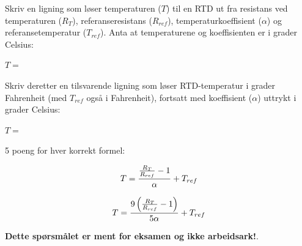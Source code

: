 

Skriv en ligning som løser temperaturen ($T$) til en RTD ut fra resistans ved temperaturen ($R_T$), referanseresistans ($R_{ref}$), temperaturkoeffisient ($\alpha$) og referansetemperatur ($T_{ref}$). Anta at temperaturene og koeffisienten er i grader Celsius:

\vskip 10pt

$T =$

\vskip 20pt

Skriv deretter en tilsvarende ligning som løser RTD-temperatur i grader Fahrenheit (med $T_{ref}$ også i Fahrenheit), fortsatt med koeffisient ($\alpha$) uttrykt i grader Celsius:

\vskip 10pt

$T =$







5 poeng for hver korrekt formel:

$$T = {{R_T \over R_{ref}} - 1 \over \alpha} + T_{ref}$$

$$T = { 9 \left( {R_T \over R_{ref}} - 1 \right) \over 5 \alpha} + T_{ref}$$







{\bf Dette spørsmålet er ment for eksamen og ikke arbeidsark!}.


